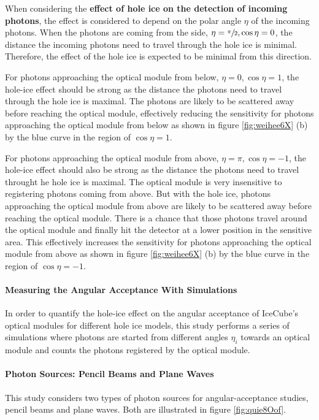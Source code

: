 When considering the \textbf{effect of hole ice on the detection of incoming photons}, the effect is considered to depend on the polar angle $\eta$ of the incoming photons. When the photons are coming from the side, $\eta = \sfrac{\pi}{2}, \cos \eta = 0$, the distance the incoming photons need to travel through the hole ice is minimal. Therefore, the effect of the hole ice is expected to be minimal from this direction.

For photons approaching the optical module from below, $\eta = 0, \cos \eta = 1$, the hole-ice effect should be strong as the distance the photons need to travel through the hole ice is maximal. The photons are likely to be scattered away before reaching the optical module, effectively reducing the sensitivity for photons approaching the optical module from below as shown in figure \ref{fig:weihee6X} (b) by the blue curve in the region of $\cos \eta = 1$.

For photons approaching the optical module from above, $\eta = \pi, \cos \eta = -1$, the hole-ice effect should also be strong as the distance the photons need to travel throught he hole ice is maximal. The optical module is very insensitive to registering photons coming from above. But with the hole ice, photons approaching the optical module from above are likely to be scattered away before reaching the optical module. There is a chance that those photons travel around the optical module and finally hit the detector at a lower position in the sensitive area. This effectively increases the sensitivity for photons approaching the optical module from above as shown in figure \ref{fig:weihee6X} (b) by the blue curve in the region of $\cos \eta = -1$.


\paragraph{Measuring the Angular Acceptance With Simulations}
In order to quantify the hole-ice effect on the angular acceptance of IceCube's optical modules for different hole ice models, this study performs a series of simulations where photons are started from different angles $\eta_i$ towards an optical module and counts the photons registered by the optical module.


\paragraph{Photon Sources: Pencil Beams and Plane Waves}
This study considers two types of photon sources for angular-acceptance studies, pencil beams and plane waves. Both are illustrated in figure \ref{fig:quie8Oof}.

